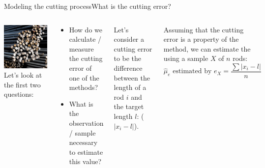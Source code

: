 \begin{frame}[t]{Modeling the cutting process}{What is the cutting error?}
  \begin{columns}[T]
    \includegraphics[width=\textwidth]{../img/steelrods}
    Let's look at the first two questions:
    \begin{block}{}
    {\smaller
    \begin{itemize}
      \item How do we calculate / measure the cutting error of one of the methods?
      \item What is the observation / sample necessary to estimate this value?
    \end{itemize}}
    \end{block}\bigskip

    Let's consider a cutting error to be the difference between the length of a rod $i$ and the target length $l$: ($|x_i - l|$). \bigskip

    Assuming that the cutting error is a property of the method, we can estimate the  using a sample $X$ of $n$ rods:
    \begin{equation*}
      \hat\mu_e \text{ estimated by } e_X = \frac{\sum{|x_i - l|}}{n}
    \end{equation*}
  \end{columns}
\end{frame}

